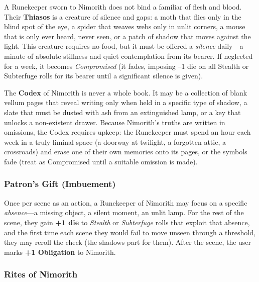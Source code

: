 A Runekeeper sworn to Nimorith does not bind a familiar of flesh and blood. Their \textbf{Thiasos} is a creature of silence and gaps: a moth that flies only in the blind spot of the eye, a spider that weaves webs only in unlit corners, a mouse that is only ever heard, never seen, or a patch of shadow that moves against the light. This creature requires no food, but it must be offered a \emph{silence} daily---a minute of absolute stillness and quiet contemplation from its bearer. If neglected for a week, it becomes \textit{Compromised} (it fades, imposing --1 die on all Stealth or Subterfuge rolls for its bearer until a significant silence is given).

The \textbf{Codex} of Nimorith is never a whole book. It may be a collection of blank vellum pages that reveal writing only when held in a specific type of shadow, a slate that must be dusted with ash from an extinguished lamp, or a key that unlocks a non-existent drawer. Because Nimorith's truths are written in omissions, the Codex requires upkeep: the Runekeeper must spend an hour each week in a truly liminal space (a doorway at twilight, a forgotten attic, a crossroads) and erase one of their own memories onto its pages, or the symbols fade (treat as Compromised until a suitable omission is made).

\subsubsection*{Patron's Gift (Imbuement)}

Once per scene as an action, a Runekeeper of Nimorith may focus on a specific \emph{absence}---a missing object, a silent moment, an unlit lamp. For the rest of the scene, they gain \textbf{+1 die} to \textit{Stealth} or \textit{Subterfuge} rolls that exploit that absence, and the first time each scene they would fail to move unseen through a threshold, they may reroll the check (the shadows part for them). After the scene, the user marks \textbf{+1 Obligation} to Nimorith.

\subsubsection*{Rites of Nimorith}

